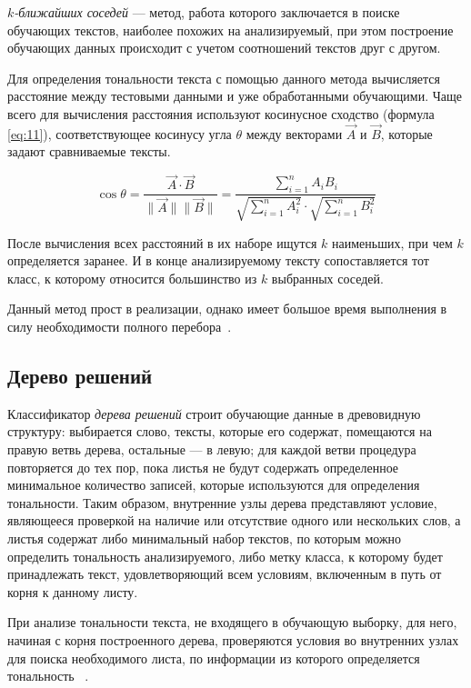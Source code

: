 \textit{$k$-ближайших соседей} --- метод, работа которого заключается в
поиске обучающих текстов, наиболее похожих на анализируемый, при этом построение
обучающих данных происходит с учетом соотношений текстов друг с другом.

Для определения тональности текста с помощью данного метода вычисляется
расстояние между тестовыми данными и уже обработанными обучающими. Чаще всего
для вычисления расстояния используют косинусное сходство (формула \ref{eq:11}),
соответствующее косинусу угла $\theta$ между векторами $\vec{A}$ и
$\vec{B}$, которые задают сравниваемые тексты.

\begin{equation}\label{eq:11}
    \cos{\theta} = \frac{\vec{A} \cdot \vec{B}}{\|\vec{A}\|\|\vec{B}\|} =
    \frac{\sum\limits_{i=1}^n{A_iB_i}}{\sqrt{\sum\limits_{i=1}^n{A_i^2}} \cdot
    \sqrt{\sum\limits_{i=1}^n{B_i^2}}}
\end{equation}

После вычисления всех расстояний в их наборе ищутся $k$ наименьших, при чем $k$
определяется заранее. И в конце анализируемому тексту сопоставляется тот класс,
к которому относится большинство из $k$ выбранных соседей.

Данный метод прост в реализации, однако имеет большое время выполнения в силу
необходимости полного перебора~\cite{article19}.

\subsection{Дерево решений}

Классификатор \textit{дерева решений} строит обучающие данные в древовидную
структуру: выбирается слово, тексты, которые его содержат, помещаются на правую
ветвь дерева, остальные --- в левую; для каждой ветви процедура повторяется до
тех пор, пока листья не будут содержать определенное минимальное количество
записей, которые используются для определения тональности. Таким образом,
внутренние узлы дерева представляют условие, являющееся проверкой на наличие
или отсутствие одного или нескольких слов, а листья содержат либо минимальный
набор текстов, по которым можно определить тональность анализируемого, либо
метку класса, к которому будет принадлежать текст, удовлетворяющий всем
условиям, включенным в путь от корня к данному листу.

При анализе тональности текста, не входящего в обучающую выборку, для него,
начиная с корня построенного дерева, проверяются условия во внутренних узлах для
поиска необходимого листа, по информации из которого определяется тональность
~\cite{article4}.

